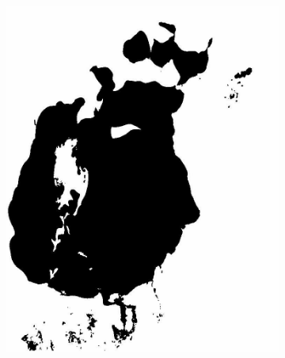 \documentclass[12pt,a4paper]{article}
\begin{document}
\begin{figure}
\begin{subfigure}[b]{0.19\textwidth}
         \includegraphics[width=\textwidth]{../img/1987w.jpg}
         \caption{}
         \label{fig:three sin x}
     \end{subfigure}
     \begin{subfigure}[b]{0.19\textwidth}
         \centering

\end{subfigure}
\end{figure}
\end{document}
